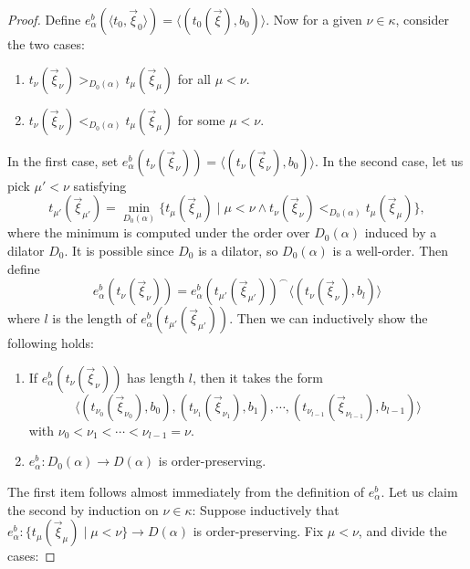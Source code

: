\documentclass{mhkr}
\newcommand{\lag}{\langle}
\newcommand{\rag}{\rangle}
\begin{document}
\begin{proof}
    Define $e^b_\alpha(\lag t_0,\vec{\xi}_0\rag) = \lag (t_0(\vec{\xi}), b_0)\rag$. Now for a given $\nu\in\kappa$, consider the two cases:
    \begin{enumerate}
        \item $t_\nu(\vec{\xi}_\nu) >_{D_0(\alpha)} t_\mu (\vec{\xi}_\mu)$ for all $\mu<\nu$.
        \item $t_\nu(\vec{\xi}_\nu) <_{D_0(\alpha)} t_\mu (\vec{\xi}_\mu)$  for some $\mu<\nu$.
    \end{enumerate}

    In the first case, set $e^b_\alpha(t_\nu(\vec{\xi}_\nu))=\lag(t_\nu(\vec{\xi}_\nu),b_{0})\rag$. In the second case, let us pick $\mu'<\nu$ satisfying
    \begin{equation} \label{Formula: mu' satisfying minimality}
        t_{\mu'}(\vec{\xi}_{\mu'}) = \min_{D_0(\alpha)} \{t_\mu(\vec{\xi}_\mu) \mid \mu <\nu\land t_\nu(\vec{\xi}_\nu) <_{D_0(\alpha)} t_\mu(\vec{\xi}_\mu) \}, \tag{$\spadesuit$}
    \end{equation}
    where the minimum is computed under the order over $D_0(\alpha)$ induced by a dilator $D_0$. It is possible since $D_0$ is a dilator, so $D_0(\alpha)$ is a well-order. Then define
    \begin{equation*}
        e^b_\alpha(t_\nu(\vec{\xi}_\nu)) = e^b_\alpha(t_{\mu'}(\vec{\xi}_{\mu'})) ^\frown \lag (t_\nu(\vec{\xi}_\nu), b_{l})\rag
    \end{equation*}
    where $l$ is the length of $e^b_\alpha(t_{\mu'}(\vec{\xi}_{\mu'}))$.
    Then we can inductively show the following holds:
    \begin{enumerate}
        \item If $e^b_\alpha(t_\nu(\vec{\xi}_\nu))$ has length $l$, then it takes the form
        \begin{equation*} 
            \lag (t_{\nu_0}(\vec{\xi}_{\nu_0}),b_{0}), (t_{\nu_1}(\vec{\xi}_{\nu_1}),b_1),\cdots, (t_{\nu_{l-1}}(\vec{\xi}_{\nu_{l-1}}),b_{l-1})\rag
        \end{equation*}
        with $\nu_0<\nu_1<\cdots<\nu_{l-1}=\nu$.
        \item $e^b_\alpha\colon D_0(\alpha)\to D(\alpha)$ is order-preserving. 
    \end{enumerate}
    The first item follows almost immediately from the definition of $e^b_\alpha$. Let us claim the second by induction on $\nu\in\kappa$:
    Suppose inductively that $e^b_\alpha\colon \{t_\mu(\vec{\xi}_\mu)\mid \mu<\nu\}\to D(\alpha)$ is order-preserving. Fix $\mu<\nu$, and divide the cases:

\end{proof}
\end{document}
